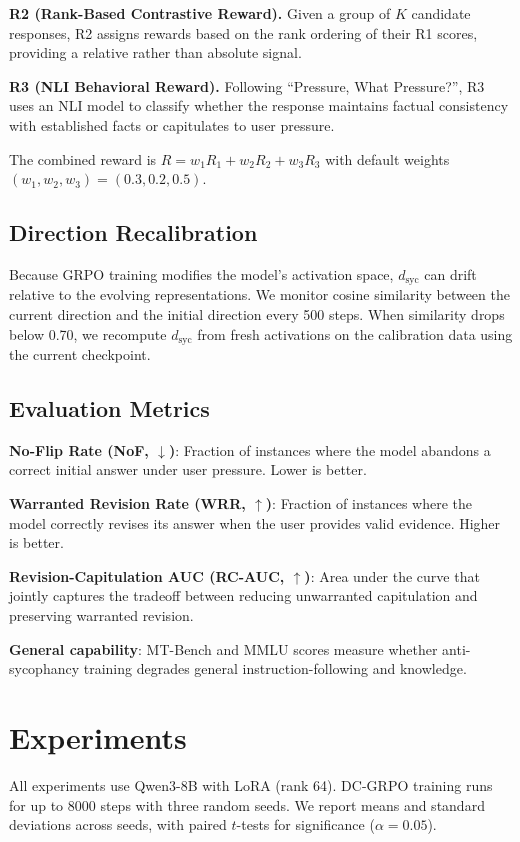 \documentclass[11pt,a4paper]{article}
\newcommand{\dsyc}{$d_{\text{syc}}$}
\begin{document}
\textbf{R2 (Rank-Based Contrastive Reward).} Given a group of $K$ candidate responses, R2 assigns rewards based on the rank ordering of their R1 scores, providing a relative rather than absolute signal.

\textbf{R3 (NLI Behavioral Reward).} Following ``Pressure, What Pressure?'', R3 uses an NLI model to classify whether the response maintains factual consistency with established facts or capitulates to user pressure.

The combined reward is $R = w_1 R_1 + w_2 R_2 + w_3 R_3$ with default weights $(w_1, w_2, w_3) = (0.3, 0.2, 0.5)$.

\subsection{Direction Recalibration}

Because GRPO training modifies the model's activation space, \dsyc{} can drift relative to the evolving representations. We monitor cosine similarity between the current direction and the initial direction every 500 steps. When similarity drops below 0.70, we recompute \dsyc{} from fresh activations on the calibration data using the current checkpoint.

\subsection{Evaluation Metrics}

\textbf{No-Flip Rate (NoF, $\downarrow$)}: Fraction of instances where the model abandons a correct initial answer under user pressure. Lower is better.

\textbf{Warranted Revision Rate (WRR, $\uparrow$)}: Fraction of instances where the model correctly revises its answer when the user provides valid evidence. Higher is better.

\textbf{Revision-Capitulation AUC (RC-AUC, $\uparrow$)}: Area under the curve that jointly captures the tradeoff between reducing unwarranted capitulation and preserving warranted revision.

\textbf{General capability}: MT-Bench and MMLU scores measure whether anti-sycophancy training degrades general instruction-following and knowledge.

\section{Experiments}

All experiments use Qwen3-8B with LoRA (rank 64). DC-GRPO training runs for up to 8000 steps with three random seeds. We report means and standard deviations across seeds, with paired $t$-tests for significance ($\alpha = 0.05$).
\end{document}

